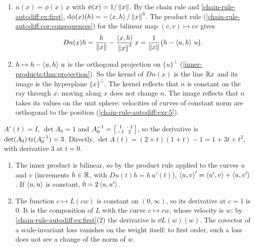 \begin{enumerate}[nosep]
  \item $n(x) = \phi(x)\,x$ with $\phi(x) = 1/\left\|x\right\|$. By the chain rule
        and \cref{chain-rule-autodiff:ex:first},
        $\mathrm{d}\phi(x)(h) = -\left\langle x, h \right\rangle/\left\|x\right\|^3$. The product rule
        (\cref{chain-rule-autodiff:cor:consequences}) for the bilinear
        map $(c, v)\mapsto cv$ gives
        \[
          Dn(x)h = \frac h{\left\|x\right\|} - \frac{\left\langle x, h \right\rangle}{\left\|x\right\|^3}\,x
          = \frac1{\left\|x\right\|}\bigl(h - \left\langle u, h \right\rangle\,u\bigr) .
        \]
  \item $h\mapsto h - \left\langle u, h \right\rangle\,u$ is the orthogonal projection on
        $\{u\}^\perp$ (\cref{inner-products:thm:projection}). So the
        kernel of $Dn(x)$ is the line $\mathbb{R} x$ and its image is the
        hyperplane $\{x\}^\perp$. The kernel reflects that $n$ is constant
        on the ray through $x$: moving along $x$ does not change $n$. The
        image reflects that $n$ takes its values on the unit sphere:
        velocities of curves of constant norm are orthogonal to the
        position (\cref{chain-rule-autodiff:exr:5}).
\end{enumerate}

$A'(t) = I$, $\det A_0 = 1$ and
$A_0^{-1} = \begin{bsmallmatrix}1 & -1\\-1 & 2\end{bsmallmatrix}$, so the
derivative is $\det(A_0)\operatorname{tr}(A_0^{-1}) = 3$. Directly,
$\det A(t) = (2 + t)(1 + t) - 1 = 1 + 3t + t^2$, with derivative $3$ at
$t = 0$.

\begin{enumerate}[nosep]
  \item The inner product is bilinear, so by the product rule applied to
        the curves $u$ and $v$ (increments $h\in\mathbb{R}$, with
        $Du(t)h = h\,u'(t)$),
        $\left\langle u, v \right\rangle' = \left\langle u', v \right\rangle + \left\langle u, v' \right\rangle$. If
        $\left\langle u, u \right\rangle$ is constant, $0 = 2\left\langle u, u' \right\rangle$.
  \item The function $c\mapsto L(cw)$ is constant on $(0, \infty)$, so its
        derivative at $c = 1$ is $0$. It is the composition of $L$ with
        the curve $c\mapsto cw$, whose velocity is $w$; by
        \cref{chain-rule-autodiff:ex:first}(2) the derivative is
        $\dd L(w)(w)$. The covector of a scale-invariant loss vanishes on
        the weight itself: to first order, such a loss does not see a
        change of the norm of $w$.
\end{enumerate}

